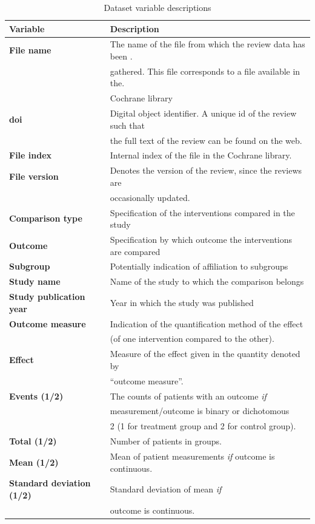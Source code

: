 \documentclass[11pt,a4paper,twoside]{book}\usepackage[]{graphicx}\usepackage[]{color}
\begin{document}
\begin{table}[ht]
  \begin{center}
    \begin{tabular}{l l}
      \textbf{Variable} & \textbf{Description}\\
      \hline
      \textbf{File name} & The name of the file from which the review data has been . \\&gathered. This file corresponds to a file available in the. \\& Cochrane library\\
      \textbf{doi} & Digital object identifier. A unique id of the review such that  \\ &the full text of the review can be found on the web.\\
      \textbf{File index} & Internal index of the file in the Cochrane library.\\
      \textbf{File version} & Denotes the version of the review, since the reviews are \\ &occasionally updated.\\
      \hline
      \textbf{Comparison type} & Specification of the interventions compared in the study\\
      \textbf{Outcome} & Specification by which outcome the interventions are compared\\
      \textbf{Subgroup} & Potentially indication of affiliation to subgroups\\
      \textbf{Study name} & Name of the study to which the comparison belongs\\
      \textbf{Study publication year} & Year in which the study was published\\
      \textbf{Outcome measure} & Indication of the quantification method of the effect \\ &(of one intervention compared to the other).\\
      \textbf{Effect} & Measure of the effect given in the quantity denoted by \\ &``outcome measure''.\\
      \textbf{Events (1/2)} & The counts of patients with an outcome \textit{if}\\ & measurement/outcome is binary or dichotomous \\ &2 (1 for treatment group and 2 for control group).\\
      \textbf{Total (1/2)} & Number of patients in groups.\\
      \textbf{Mean (1/2)} & Mean of patient measurements \textit{if} outcome is continuous.\\
      \textbf{Standard deviation (1/2)} & Standard deviation of mean \textit{if} \\ &outcome is continuous.
    \end{tabular}
  \caption{Dataset variable descriptions}
  \label{variable}
  \end{center}
\end{table}
\end{document}
